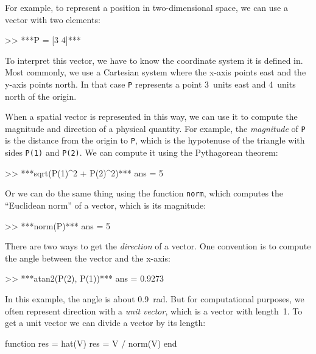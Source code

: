 
For example, to represent a position in two-dimensional space, we can use a vector with two elements:

\begin{code}
>> ***P = [3 4]***
\end{code}

To interpret this vector, we have to know the coordinate system it is defined in.  Most commonly, we use a Cartesian system where the x-axis points east and the y-axis points north.  In that case \lstinline{P} represents a point 3~units east and 4~units north of the origin.


When a spatial vector is represented in this way, we can use it to compute the magnitude and direction of a physical quantity.  
For example, the \emph{magnitude} of \lstinline{P} is the distance from the origin to \lstinline{P}, which is the hypotenuse of the triangle with sides \lstinline{P(1)} and \lstinline{P(2)}.  
We can compute it using the Pythagorean theorem:

\begin{code}
>> ***sqrt(P(1)^2 + P(2)^2)***
ans = 5
\end{code}

Or we can do the same thing using the function \lstinline{norm}, which computes the
``Euclidean norm'' of a vector, which is its magnitude:


\begin{code}
>> ***norm(P)***
ans = 5
\end{code}

There are two ways to get the \emph{direction} of a vector.  One convention is to compute the angle between the vector and the x-axis:

\begin{code}
>> ***atan2(P(2), P(1))***
ans = 0.9273
\end{code}

In this example, the angle is about \SI{0.9}{\radian}.  But for computational purposes, we often represent direction with a \emph{unit vector}, which is a vector with length~1.  To get a unit vector we can divide a vector by its length:

\begin{code}
function res = hat(V)
    res = V / norm(V)
end
\end{code}
 
